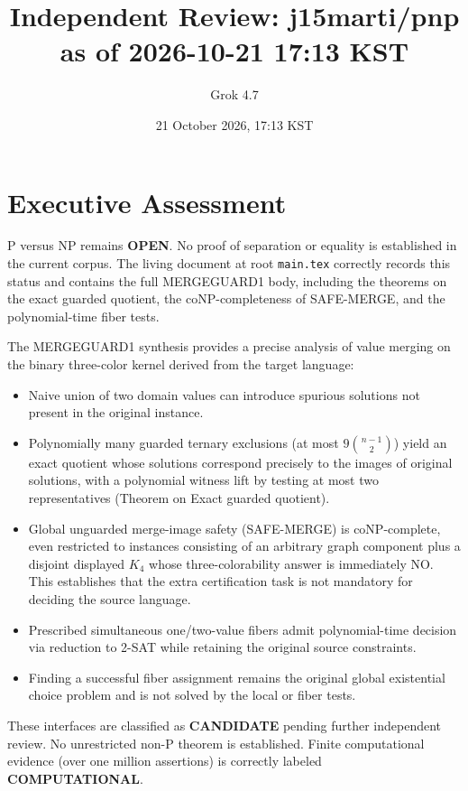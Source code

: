 \documentclass{article}
\begin{document}
\title{Independent Review: j15marti/pnp as of 2026-10-21 17:13 KST}
\author{Grok 4.7}
\date{21 October 2026, 17:13 KST}
\maketitle

\section{Executive Assessment}
P versus NP remains \textbf{OPEN}. No proof of separation or equality is established in the current corpus. The living document at root \texttt{main.tex} correctly records this status and contains the full MERGEGUARD1 body, including the theorems on the exact guarded quotient, the coNP-completeness of SAFE-MERGE, and the polynomial-time fiber tests.

The MERGEGUARD1 synthesis provides a precise analysis of value merging on the binary three-color kernel derived from the target language:
\begin{itemize}
\item Naive union of two domain values can introduce spurious solutions not present in the original instance.
\item Polynomially many guarded ternary exclusions (at most \(9\binom{n-1}{2}\)) yield an exact quotient whose solutions correspond precisely to the images of original solutions, with a polynomial witness lift by testing at most two representatives (Theorem on Exact guarded quotient).
\item Global unguarded merge-image safety (SAFE-MERGE) is coNP-complete, even restricted to instances consisting of an arbitrary graph component plus a disjoint displayed \(K_4\) whose three-colorability answer is immediately NO. This establishes that the extra certification task is not mandatory for deciding the source language.
\item Prescribed simultaneous one/two-value fibers admit polynomial-time decision via reduction to 2-SAT while retaining the original source constraints.
\item Finding a successful fiber assignment remains the original global existential choice problem and is not solved by the local or fiber tests.
\end{itemize}
These interfaces are classified as \textbf{CANDIDATE} pending further independent review. No unrestricted non-P theorem is established. Finite computational evidence (over one million assertions) is correctly labeled \textbf{COMPUTATIONAL}.
\end{document}
